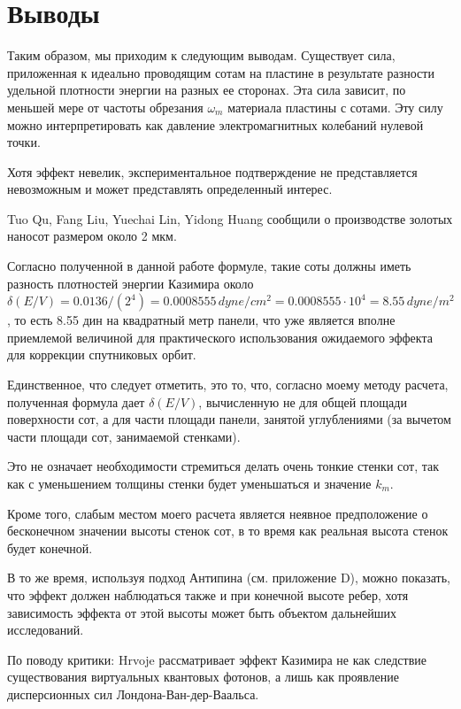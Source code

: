 \documentclass[11pt]{article}
\begin{document}
    \section{Выводы}\label{ux432ux44bux432ux43eux434ux44b}

    Таким образом, мы приходим к следующим выводам. Существует сила,
приложенная к идеально проводящим сотам на пластине в результате
разности удельной плотности энергии на разных ее сторонах. Эта сила
зависит, по меньшей мере от частоты обрезания \(\omega_m\) материала
пластины с сотами. Эту силу можно интерпретировать как давление
электромагнитных колебаний нулевой точки.

    Хотя эффект невелик, экспериментальное подтверждение не представляется
невозможным и может представлять определенный интерес.

    Tuo Qu, Fang Liu, Yuechai Lin, Yidong Huang \cite{Tuo2019} сообщили о
производстве золотых наносот размером около 2 мкм.

Согласно полученной в данной работе формуле, такие соты должны иметь
разность плотностей энергии Казимира около
\(\delta\left(E/V\right) = 0.0136/({2^4}) = 0.0008555\,dyne/cm^2 = 0.0008555 \cdot 10^4 = 8.55\,dyne/m^2\),
то есть 8.55 дин на квадратный метр панели, что уже является вполне
приемлемой величиной для практического использования ожидаемого эффекта
для коррекции спутниковых орбит.

Единственное, что следует отметить, это то, что, согласно моему методу
расчета, полученная формула дает \(\delta\left(E/V\right)\), вычисленную
не для общей площади поверхности сот, а для части площади панели,
занятой углублениями (за вычетом части площади сот, занимаемой
стенками).

Это не означает необходимости стремиться делать очень тонкие стенки сот,
так как с уменьшением толщины стенки будет уменьшаться и значение
\(k_m\).

Кроме того, слабым местом моего расчета является неявное предположение о
бесконечном значении высоты стенок сот, в то время как реальная высота
стенок будет конечной.

В то же время, используя подход Антипина (см. приложение D), можно
показать, что эффект должен наблюдаться также и при конечной высоте
ребер, хотя зависимость эффекта от этой высоты может быть объектом
дальнейших исследований.

По поводу критики: Hrvoje \cite{Hrvoje2016} рассматривает эффект
Казимира не как следствие существования виртуальных квантовых фотонов, а
лишь как проявление дисперсионных сил Лондона-Ван-дер-Ваальса.
\end{document}
